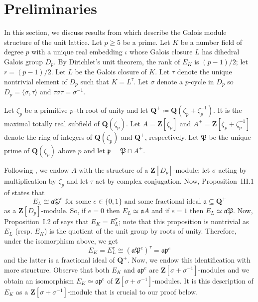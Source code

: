 \documentclass{amsart}
\newcommand{\QQ}{\mathbf{Q}}
\newcommand{\ZZ}{\mathbf{Z}}
\newcommand{\mf}[1]{\mathfrak{#1}}
\numberwithin{equation}{section}
\begin{document}
\section{Preliminaries}
\label{sec:pre}
In this section, we discuss results from \cite{Moser1979} which describe the Galois module structure of the unit lattice. Let $p \geq 5$ be a prime. Let $K$ be a number field of degree $p$ with a unique real embedding $\iota$ whose Galois closure $L$ has dihedral Galois group $D_p$. By Dirichlet's unit theorem, the rank of $E_K$ is $(p-1)/2$; let $r = (p-1)/2$. Let $L$ be the Galois closure of $K$. Let $\tau$ denote the unique nontrivial element of $D_p$ such that $K=L^\tau$. Let $\sigma$ denote a $p$-cycle in $D_p$ so $D_p=\langle\sigma,\tau\rangle$ and $\tau\sigma\tau=\sigma^{-1}$. 

Let $\zeta_p$ be a primitive $p$--th root of unity and let $\QQ^+\coloneqq\QQ(\zeta_p+\zeta_p^{-1})$. It is the maximal totally real subfield of $\QQ(\zeta_p)$. Let $A = \ZZ[\zeta_p]$ and $A^+ = \ZZ[\zeta_p+\zeta_p^{-1}]$ denote the ring of integers of $\QQ(\zeta_p)$ and $\QQ^+$, respectively. Let $\mf{P}$ be the unique prime of $\QQ(\zeta_p)$ above $p$ and let $\mf{p}=\mf{P}\cap A^+$. 


Following \cite{Moser1979}, we endow $A$ with the structure of a $\ZZ[D_p]$-module; let $\sigma$ acting by multiplication by $\zeta_p$ and let $\tau$ act by complex conjugation. Now, Proposition~III.1 of \cite{Moser1979} states that
\[
	E_L\cong\mf{a}\mf{P}^e\text{ for some $e\in\{0,1\}$ and some fractional ideal $\mf{a} \subseteq \QQ^+$}
\]
as a $\ZZ[D_p]$-module. So, if $e = 0$ then $E_L \simeq \mathfrak{a}A$ and if $e = 1$ then $E_L \simeq \mathfrak{a}\mathfrak{P}$. Now, Proposition~I.2 of \cite{Moser1979} says that $E_K=E_L^\tau$; note that this proposition is nontrivial as $E_L$ (resp. $E_K$) is the quotient of the unit group by roots of unity. Therefore, under the isomorphism above, we get
\[
    E_K=E_L^\tau \cong (\mf{a}\mf{P}^e)^{\tau} = \mf{a}\mf{p}^e 
\]
and the latter is a fractional ideal of $\QQ^+$. Now, we endow this identification with more structure. Observe that both $E_K$ and $\mf{a}\mf{p}^e$ are $\ZZ[\sigma + \sigma^{-1}]$-modules and we obtain an isomorphism $E_K \simeq \mf{a}\mf{p}^e$ of $\ZZ[\sigma + \sigma^{-1}]$-modules. It is this description of $E_K$ as a $\ZZ[\sigma + \sigma^{-1}]$-module that is crucial to our proof below. 
\end{document}
